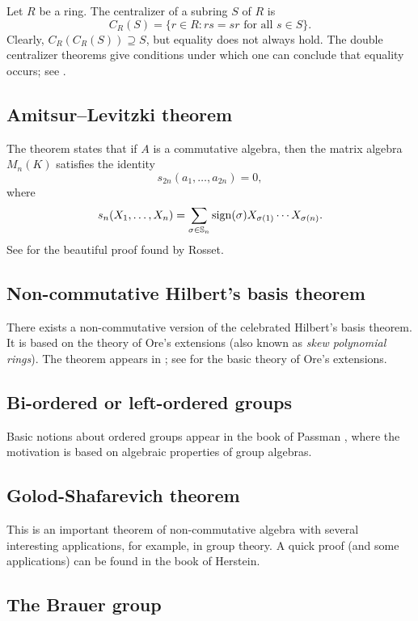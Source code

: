 Let $R$ be a ring. 
The centralizer of a subring $S$ of $R$ 
is 
\[
C_R(S)=\{r\in R: rs=sr\text{ for all $s\in S$}\}.
\]
Clearly, $C_R(C_R(S))\supseteq S$, but equality does not always hold. 
The double centralizer theorems give conditions under which one can conclude that equality occurs; see \cite[Chapter 4]{MR3308118}. 

\subsection*{Amitsur--Levitzki theorem}

The theorem states that 
if $A$ is a commutative algebra, then 
the matrix algebra 
$M_n(K)$ satisfies the identity 
\[
s_{2n}(a_{1},\dots ,a_{2n})=0,
\]
where 
\[
s_{n}(X_1,\dots,X_n)=\sum_{\sigma\in\mathbb{S}_n}\operatorname{sign}(\sigma)X_{\sigma(1)}\cdots X_{\sigma(n)}.
\]
See \cite[Theorem 6.39]{MR3308118} for the beautiful 
proof found by Rosset. 

\subsection*{Non-commutative Hilbert's basis theorem}

There exists a non-commutative version of the celebrated
Hilbert's basis theorem. It is based on the theory of Ore's extensions (also known as \emph{skew polynomial rings}). The theorem
appears in \cite[I.8.3]{MR1321145}; see \cite[I.7]{MR1321145} 
for the basic theory of Ore's extensions. 

\subsection*{Bi-ordered or left-ordered groups}

Basic notions about ordered groups appear in the book
of Passman \cite{MR798076}, where the motivation is based on 
algebraic properties of group algebras. 

\subsection*{Golod-Shafarevich theorem}

This is an important theorem of non-commutative algebra
with several interesting applications, for example, in group theory. 
A quick proof (and some applications) can be found in the book \cite{MR1449137} of Herstein. 

\subsection*{The Brauer group}

